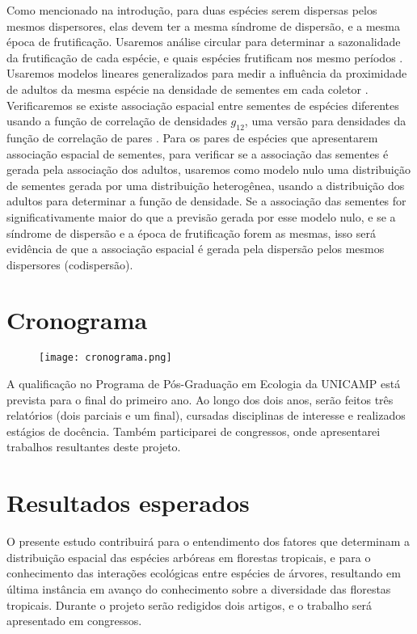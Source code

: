 \documentclass[twoside,12pt,a4paper]{report}
\begin{document}
Como mencionado na introdução, para duas espécies
serem dispersas pelos mesmos dispersores, elas devem ter a mesma síndrome de dispersão, e a
mesma época de frutificação.
Usaremos análise circular para determinar a sazonalidade da frutificação de cada
espécie, e quais espécies frutificam nos mesmo períodos \citep{analisecircular}. 
Usaremos modelos lineares generalizados para medir a influência da proximidade de adultos da mesma
espécie na densidade de sementes em cada coletor \citep{Hardesty2002}. 
Verificaremos se existe associação espacial entre sementes de espécies diferentes usando a
função de correlação de densidades $g_{12}$, uma versão para densidades da função de
correlação de pares \citep{Fedriani2015}. 
Para os pares de espécies que apresentarem associação espacial de sementes, para verificar se
a associação das sementes é gerada pela associação dos adultos, usaremos
como modelo nulo uma distribuição de sementes gerada por uma distribuição heterogênea, usando
a distribuição dos adultos para determinar a função de densidade.
Se a associação das sementes for significativamente maior do que a previsão gerada por esse modelo nulo,
e se a síndrome de dispersão e a época de frutificação forem as mesmas, isso será evidência
de que a associação espacial é gerada pela dispersão pelos mesmos dispersores (codispersão).

\section{Cronograma}

	\begin{figure}[ht]
		\centering \texttt{[image: cronograma.png]}
    \end{figure}

A qualificação no Programa de Pós-Graduação em Ecologia da UNICAMP está prevista para o final do
primeiro ano. Ao longo dos dois anos, serão feitos três relatórios (dois parciais e um final),
cursadas disciplinas de interesse e realizados estágios de docência. Também participarei de
congressos, onde apresentarei trabalhos resultantes deste projeto.

\section{Resultados esperados}
O presente estudo contribuirá para o entendimento dos fatores que determinam a distribuição espacial
das espécies arbóreas em florestas tropicais, e para o conhecimento das interações ecológicas entre
espécies de árvores, resultando em última instância em avanço do conhecimento sobre a diversidade
das florestas tropicais. Durante o projeto serão redigidos dois artigos, e o trabalho será apresentado
em congressos.



    
    
\end{document}
